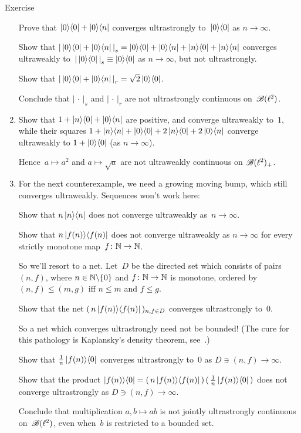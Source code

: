 \documentclass[a]{subfiles}
\begin{document}
\begin{parsec}
\begin{point}[vn-counterexamples]{Exercise}
\begin{enumerate}
Prove that $\left|0\right>\!\left<0\right| + \left|0\right>\!\left<n\right|$
converges ultrastrongly to~$\left|0\right>\!\left<0\right|$ as $n\to \infty$.

Show that $\left|\,\left|0\right>\!\left<0\right|+\left|0\right>\!\left<n\right|\,\right|_s
= \left|0\right>\!\left<0\right|
+\left|0\right>\!\left<n\right|
+\left|n\right>\!\left<0\right|
+\left|n\right>\!\left<n\right|$
converges ultraweakly to~$\left|\,\left|0\right>\!\left<0\right|\,\right|_s
\equiv \left|0\right>\!\left<0\right|$
as $n\to \infty$,
but not ultrastrongly.

Show that $\left|\,\left|0\right>\!\left<0\right|+\left|0\right>\!\left<n\right|\,\right|_r
= \sqrt{2} \left|0\right>\!\left<0\right|$.

Conclude that $\left|\,\cdot\,\right|_s$
and $\left|\,\cdot\,\right|_r$
are not ultrastrongly continuous on~$\mathscr{B}(\ell^2)$.

\item
Show that $1+\left|n\right>\!\left<0\right|+\left|0\right>\!\left<n\right|$
are positive,
and 
converge ultraweakly to~$1$,
while their squares
$1+\left|n\right>\!\left<n\right|+\left|0\right>\!\left<0\right|+2\left|n\right>\!\left<0\right|+2\left|0\right>\!\left<n\right|$
converge ultraweakly to $1+\left|0\right>\!\left<0\right|$
(as $n\to\infty$).

Hence~$a\mapsto a^2$
and $a\mapsto \sqrt{a}$
are not ultraweakly continuous on $\mathscr{B}(\ell^2)_{+}$.

\item
For the next counterexample,
we need a growing moving bump,
which still converges ultraweakly.
Sequences won't work here:

Show that $n\left|n\right>\!\left<n\right|$ does not converge ultraweakly as~$n\to\infty$.

Show that $n \left|f(n)\right>\!\left<f(n)\right|$ does not converge ultraweakly
as $n\to\infty$
for every strictly monotone map~$f\colon \mathbb{N}\to\mathbb{N}$.

So we'll resort to a net.
Let~$D$ be the directed set which consists of pairs $(n,f)$,
where $n\in \mathbb{N}\backslash\{0\}$ and $f\colon \mathbb{N}\to\mathbb{N}$
is monotone, ordered by $(n,f)\leq (m,g)$ iff $n\leq m$ and $f\leq g$.

Show that the net $(\, n\left|f(n)\right>\!\left<f(n)\right|\,)_{n,f\in D}$
converges ultrastrongly to~$0$.

So a net which converges ultrastrongly need not be bounded!
(The cure for this pathology is Kaplansky's density theorem, 
see~.)

Show that $\frac{1}{n} \left|f(n)\right>\!\left<0\right|$
converges ultrastrongly to~$0$ as $D\ni(n,f)\to \infty$.

Show that the product
$\left|f(n)\right>\!\left<0\right| = (\,n\left|f(n)\right>\!\left<f(n)\right|\,)\,(\,\frac{1}{n}
\left|f(n)\right>\!\left<0\right|\,)$
does not converge ultrastrongly 
as $D\ni(n,f)\to\infty$.

Conclude that multiplication $a,b\mapsto ab$
is not jointly ultrastrongly continuous on~$\mathscr{B}(\ell^2)$,
even when~$b$ is restricted to a bounded set.


\end{enumerate}
\end{point}
\end{parsec}
\end{document}
